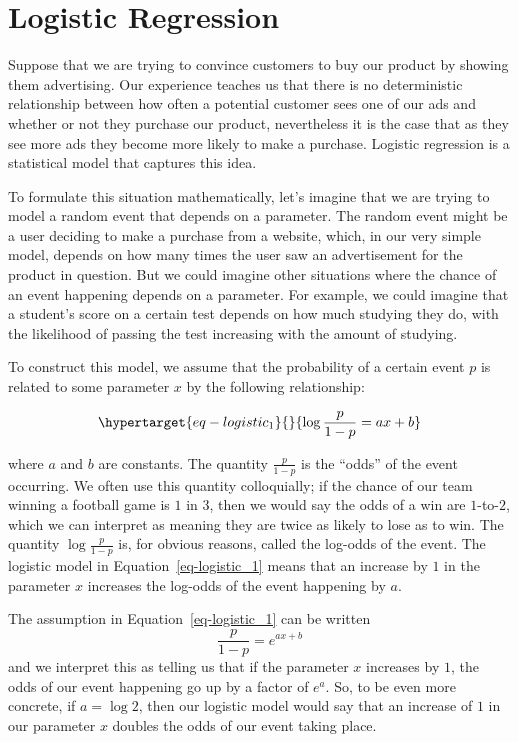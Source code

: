 \documentclass[
  11pt,
  letterpaper,
]{scrbook}
\theoremstyle{plain}
\theoremstyle{plain}
\theoremstyle{remark}
\begin{document}

\hypertarget{logistic-regression}{%
\chapter{Logistic Regression}\label{logistic-regression}}

Suppose that we are trying to convince customers to buy our product by
showing them advertising. Our experience teaches us that there is no
deterministic relationship between how often a potential customer sees
one of our ads and whether or not they purchase our product,
nevertheless it is the case that as they see more ads they become more
likely to make a purchase. Logistic regression is a statistical model
that captures this idea.

To formulate this situation mathematically, let's imagine that we are
trying to model a random event that depends on a parameter. The random
event might be a user deciding to make a purchase from a website, which,
in our very simple model, depends on how many times the user saw an
advertisement for the product in question. But we could imagine other
situations where the chance of an event happening depends on a
parameter. For example, we could imagine that a student's score on a
certain test depends on how much studying they do, with the likelihood
of passing the test increasing with the amount of studying.

To construct this model, we assume that the probability of a certain
event \(p\) is related to some parameter \(x\) by the following
relationship:

\begin{equation}\protect\hypertarget{eq-logistic_1}{}{
\log\frac{p}{1-p} = ax+b 
}\label{eq-logistic_1}\end{equation}

where \(a\) and \(b\) are constants. The quantity \(\frac{p}{1-p}\) is
the ``odds'' of the event occurring. We often use this quantity
colloquially; if the chance of our team winning a football game is \(1\)
in \(3\), then we would say the odds of a win are \(1\)-to-\(2\), which
we can interpret as meaning they are twice as likely to lose as to win.
The quantity \(\log\frac{p}{1-p}\) is, for obvious reasons, called the
log-odds of the event. The logistic model in
Equation~\ref{eq-logistic_1} means that an increase by \(1\) in the
parameter \(x\) increases the log-odds of the event happening by \(a\).

The assumption in Equation~\ref{eq-logistic_1} can be written \[
\frac{p}{1-p} = e^{ax+b}
\] and we interpret this as telling us that if the parameter \(x\)
increases by \(1\), the odds of our event happening go up by a factor of
\(e^{a}\). So, to be even more concrete, if \(a=\log 2\), then our
logistic model would say that an increase of \(1\) in our parameter
\(x\) doubles the odds of our event taking place.
\end{document}
